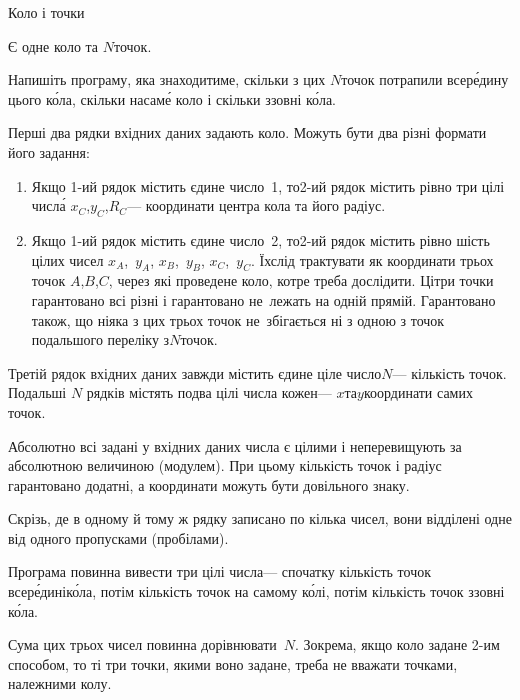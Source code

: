 \begin{problemAllDefault}{Коло і точки}

Є одне коло та $N$\nolinebreak[3] точок. 

\Task	Напишіть програму, яка знаходитиме, скільки з цих $N$\nolinebreak[3] точок потрапили всер\'{е}\-дину цього к\'{о}ла, скільки на\nolinebreak[3] сам\'{е} коло і скільки ззовні к\'{о}ла.


\InputFile  Перші два рядки вхідних даних задають коло. Можуть бути два різні формати його задання:
\begin{enumerate}
\item
Якщо \mbox{1-ий} рядок містить єдине число~1, то\nolinebreak[3] \mbox{2-ий} рядок містить рівно три цілі числ\'{а} $x_C$,\nolinebreak[3] $y_C$,\nolinebreak[2] $R_C$\nolinebreak[3] --- координати центра кола та його радіус.
\item
Якщо \mbox{1-ий} рядок містить єдине число~2, то\nolinebreak[3] \mbox{2-ий} рядок містить рівно шість цілих чисел $x_A$,~$y_A$, $x_B$,~$y_B$, $x_C$,~$y_C$. Їх\nolinebreak[2] слід трактувати як координати трьох точок $A$,\nolinebreak[3] $B$,\nolinebreak[3] $C$, через які проведене коло, котре треба дослідити. Ці\nolinebreak[2] три точки гарантовано всі різні і гарантовано не~лежать на одній прямій. Гарантовано також, що ніяка з цих трьох точок не~збігається ні з одною з точок подальшого переліку з\nolinebreak[3] $N$\nolinebreak[3] точок.
\end{enumerate}

Третій рядок вхідних даних завжди містить єдине ціле число\nolinebreak[3] $N$\nolinebreak[3] --- кількість точок. Подальші $N$ рядків містять по\nolinebreak[2] два цілі числа кожен\nolinebreak[3] --- $x$\nolinebreak[3] та\nolinebreak[1] $y$\nolinebreak[2] координати самих точок.

Абсолютно всі задані у вхідних даних числа є цілими і не\nolinebreak[3] перевищують за абсолютною величиною (модулем). При цьому кількість точок і радіус гарантовано додатні, а координати можуть бути довільного знаку.

Скрізь, де в одному й тому ж рядку записано по кілька чисел, вони відділені одне від одного пропусками (пробілами).


\OutputFile Програма повинна вивести три цілі числа\nolinebreak[3] --- спочатку кількість точок всер\'{е}\-дині\nolinebreak[2] к\'{о}ла, потім кількість точок на самому к\'{о}лі, потім кількість точок ззовні к\'{о}ла.

Сума цих трьох чисел повинна дорівнювати~$N$. Зокрема, якщо коло задане \mbox{2-им} способом, то ті три точки, якими воно задане, треба не вважати точками, належними колу.




\end{problemAllDefault}
